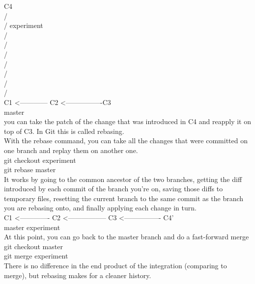 \documentclass[11pt]{article}
\begin{document}
                             C4\\
                          /\\
                         /   experiment\\
                        /\\
                              /\\
                      /\\
                     /\\
                    /\\
                   /\\
                                /\\
C1 <------------ C2 <----------------C3\\

master\\


you can take the patch of the change that was introduced in C4 and reapply it on top of C3. In Git this is called rebasing.\\
With the rebase command, you can take all the changes that were committed on one branch and replay them on another one.\\

git checkout experiment\\
git rebase master\\

It works by going to the common ancestor of the two branches, getting the diff introduced by each commit of the branch you're on, saving those diffs to temporary files, resetting the current branch to the same commit as the branch you are rebasing onto, and finally applying each change in turn.\\



C1 <------------- C2 <----------------- C3 <---------------- C4'\\
                                                  master		      experiment\\

At this point, you can go back to the master branch and do a fast-forward merge\\
git checkout master\\
git merge experiment\\


There is no difference in the end product of the integration (comparing to merge), but rebasing makes for a cleaner history.\\
\end{document}
